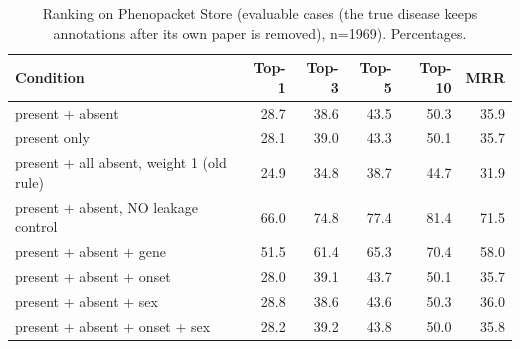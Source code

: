 \begin{table}[t]
\centering\small
\begin{tabular}{lrrrrr}
\toprule
Condition & Top-1 & Top-3 & Top-5 & Top-10 & MRR \\
\midrule
present + absent & 28.7 & 38.6 & 43.5 & 50.3 & 35.9 \\
present only & 28.1 & 39.0 & 43.3 & 50.1 & 35.7 \\
present + all absent, weight 1 (old rule) & 24.9 & 34.8 & 38.7 & 44.7 & 31.9 \\
present + absent, NO leakage control & 66.0 & 74.8 & 77.4 & 81.4 & 71.5 \\
present + absent + gene & 51.5 & 61.4 & 65.3 & 70.4 & 58.0 \\
present + absent + onset & 28.0 & 39.1 & 43.7 & 50.1 & 35.7 \\
present + absent + sex & 28.8 & 38.6 & 43.6 & 50.3 & 36.0 \\
present + absent + onset + sex & 28.2 & 39.2 & 43.8 & 50.0 & 35.8 \\
\bottomrule
\end{tabular}
\caption{Ranking on Phenopacket Store (evaluable cases (the true disease keeps annotations after its own paper is removed), n=1969). Percentages.}
\label{tab:rank-full-ev}
\end{table}
